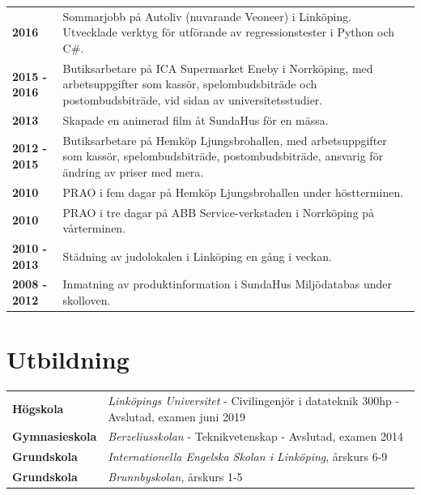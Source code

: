 \documentclass[a4paper,notitlepage]{article}
\begin{document}
\begin{longtable}{@{}l p{13cm}}
\textbf{2016} & Sommarjobb på Autoliv (nuvarande Veoneer) i Linköping. Utvecklade verktyg för
    utförande av regressionstester i Python och C\#.\\

\textbf{2015 - 2016} & Butiksarbetare på ICA Supermarket Eneby i Norrköping, med
arbetsuppgifter som kassör, spelombudsbiträde och postombudsbiträde, vid sidan
av universitetsstudier. \\

\textbf{2013} & Skapade en animerad film åt SundaHus för en mässa.
\\

\textbf{2012 - 2015} & Butiksarbetare på Hemköp Ljungsbrohallen,
med arbetsuppgifter
som kassör,
spelombudsbiträde, postombudsbiträde, ansvarig för ändring av priser med mera.
\\

\textbf{2010} & PRAO i fem dagar på Hemköp Ljungsbrohallen under
höstterminen. \\

\textbf{2010} & PRAO i tre dagar på ABB Service-verkstaden i
Norrköping på vårterminen. \\

\textbf{2010 - 2013} & Städning av judolokalen i Linköping en gång
i veckan. \\

\textbf{2008 - 2012} & Inmatning av produktinformation i SundaHus Miljödatabas under
skolloven.	\\

\end{longtable}

\section*{Utbildning}
\begin{tabular}{@{}l p{11cm}}
	\textbf{Högskola} & \textit{Linköpings Universitet} - Civilingenjör i
	datateknik 300hp - Avslutad, examen juni 2019 \\

	\textbf{Gymnasieskola} & \textit{Berzeliusskolan} - Teknikvetenskap -
	Avslutad, examen 2014 \\

	\textbf{Grundskola} & \textit{Internationella Engelska Skolan i Linköping},
	årskurs 6-9 \\

	\textbf{Grundskola} & \textit{Brunnbyskolan}, årskurs 1-5 \\
\end{tabular}
\end{document}
